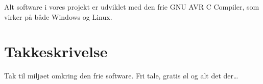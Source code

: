 Alt software i vores projekt er udviklet med den frie GNU AVR C
Compiler, som virker på både Windows og Linux.


\section{Takkeskrivelse}


Tak til miljøet omkring den frie software. Fri tale, gratis øl og alt
det der\dots {}


